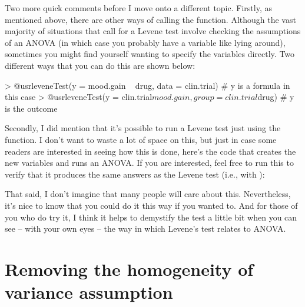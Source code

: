 Two more quick comments before I move onto a different topic. Firstly, as mentioned above, there are other ways of calling the  function. Although the vast majority of situations that call for a Levene test involve checking the assumptions of an ANOVA (in which case you probably have a variable like  lying around), sometimes you might find yourself wanting to specify the variables directly. Two different ways that you can do this are shown below:
\begin{rblock1}
> @usr{leveneTest(y = mood.gain ~ drug, data = clin.trial)}   # y is a formula in this case
> @usr{leveneTest(y = clin.trial$mood.gain, group = clin.trial$drug)}   # y is the outcome  
\end{rblock1}
Secondly, I did mention that it's possible to run a Levene test just using the  function. I don't want to waste a lot of space on this, but just in case some readers are interested in seeing how this is done, here's the code that creates the new variables and runs an ANOVA. If you are interested, feel free to run this to verify that it produces the same answers as the Levene test (i.e., with ):
That said, I don't imagine that many people will care about this. Nevertheless, it's nice to know that you could do it this way if you wanted to. And for those of you who do try it, I think it helps to demystify the test a little bit when you can see -- with your own eyes -- the way in which Levene's test relates to ANOVA. 


\section{Removing the homogeneity of variance assumption~\label{sec:welchoneway}}

